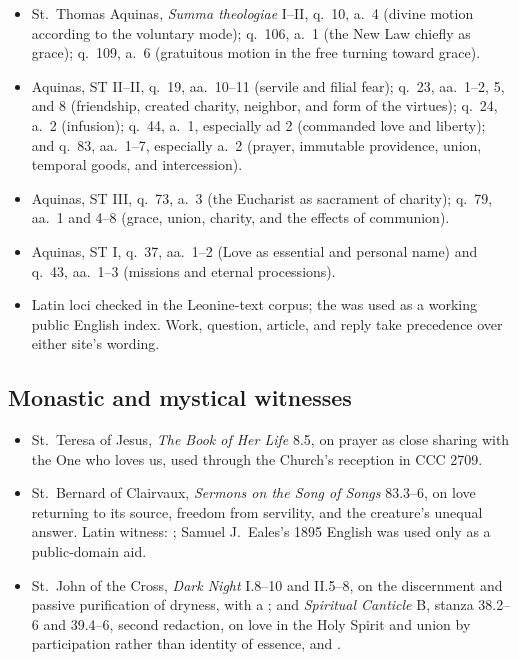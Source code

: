 {\fontsize{8.6}{9.6}\selectfont
\begin{itemize}[itemsep=0pt,parsep=0pt,topsep=0.05em]
\item St.~Thomas Aquinas, \emph{Summa theologiae} I--II, q.~10, a.~4 (divine motion according to the voluntary mode); q.~106, a.~1 (the New Law chiefly as grace); q.~109, a.~6 (gratuitous motion in the free turning toward grace).
\item Aquinas, ST II--II, q.~19, aa.~10--11 (servile and filial fear); q.~23, aa.~1--2, 5, and 8 (friendship, created charity, neighbor, and form of the virtues); q.~24, a.~2 (infusion); q.~44, a.~1, especially ad 2 (commanded love and liberty); and q.~83, aa.~1--7, especially a.~2 (prayer, immutable providence, union, temporal goods, and intercession).
\item Aquinas, ST III, q.~73, a.~3 (the Eucharist as sacrament of charity); q.~79, aa.~1 and 4--8 (grace, union, charity, and the effects of communion).
\item Aquinas, ST I, q.~37, aa.~1--2 (Love as essential and personal name) and q.~43, aa.~1--3 (missions and eternal processions).
\item Latin loci checked in the  Leonine-text corpus; the  was used as a working public English index. Work, question, article, and reply take precedence over either site's wording.
\end{itemize}}

\subsection*{Monastic and mystical witnesses}

{\fontsize{8.6}{9.6}\selectfont
\begin{itemize}[itemsep=0pt,parsep=0pt,topsep=0.05em]
\item St.~Teresa of Jesus, \emph{The Book of Her Life} 8.5, on prayer as close sharing with the One who loves us, used through the Church's reception in CCC 2709.
\item St.~Bernard of Clairvaux, \emph{Sermons on the Song of Songs} 83.3--6, on love returning to its source, freedom from servility, and the creature's unequal answer. Latin witness: ; Samuel J.~Eales's 1895 English was used only as a public-domain aid.
\item St.~John of the Cross, \emph{Dark Night} I.8--10 and II.5--8, on the discernment and passive purification of dryness, with a ; and \emph{Spiritual Canticle} B, stanza 38.2--6 and 39.4--6, second redaction, on love in the Holy Spirit and union by participation rather than identity of essence,  and .
\end{itemize}}

\endgroup
